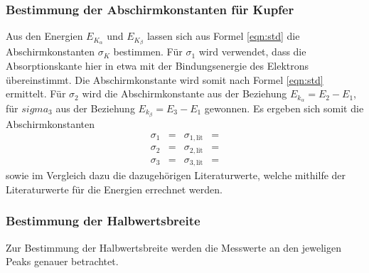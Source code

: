 \subsubsection{Bestimmung der Abschirmkonstanten für Kupfer}
Aus den Energien $E_{K_\alpha}$ und $E_{K_\beta}$ lassen sich aus Formel \eqref{eqn:std} die Abschirmkonstanten $\sigma_K$ bestimmen.
Für $\sigma_1$ wird verwendet, dass die Absorptionskante hier in etwa mit der Bindungsenergie des Elektrons übereinstimmt.
Die Abschirmkonstante wird somit nach Formel \eqref{eqn:std} ermittelt.
Für $\sigma_2$ wird die Abschirmkonstante aus der Beziehung $E_{k_\alpha} = E_2 - E_1$, für $sigma_3$ aus der Beziehung  $E_{k_\beta} = E_3 - E_1$ gewonnen.
Es ergeben sich somit die Abschirmkonstanten
\begin{align*}
  \sigma_{1} &=  & \sigma_{1, \text{lit}} &=  \\
  \sigma_{2} &=  & \sigma_{2, \text{lit}} &=  \\
  \sigma_{3} &=  & \sigma_{3, \text{lit}} &= 
\end{align*}
sowie im Vergleich dazu die dazugehörigen Literaturwerte, welche mithilfe der Literaturwerte \cite{energie} für die Energien errechnet werden.

\subsubsection{Bestimmung der Halbwertsbreite}
Zur Bestimmung der Halbwertsbreite werden die Messwerte an den jeweligen Peaks genauer betrachtet.

